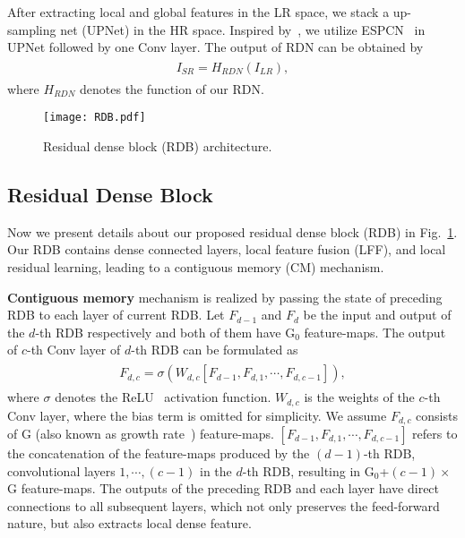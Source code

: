\documentclass[10pt,twocolumn,letterpaper]{article}
\begin{document}
After extracting local and global features in the LR space, we stack a up-sampling net (UPNet) in the HR space. Inspired by~\cite{lim2017enhanced}, we utilize ESPCN~\cite{shi2016real} in UPNet followed by one Conv layer. The output of RDN can be obtained by
\begin{align}
\begin{split}
\label{eq:I_SR}
I_{SR}=H_{RDN}\left ( I_{LR} \right ),
\end{split}
\end{align}  
where $H_{RDN}$ denotes the function of our RDN.
\begin{figure}[htpb]
\centering
\texttt{[image: RDB.pdf]}
\caption{Residual dense block (RDB) architecture.}
\label{fig:RDB} 
\vspace{-4mm} 
\end{figure}

\subsection{Residual Dense Block}
\label{subsec:RDB}
   
Now we present details about our proposed residual dense block (RDB) in Fig.~\ref{fig:RDB}. Our RDB contains dense connected layers, local feature fusion (LFF), and local residual learning, leading to a contiguous memory (CM) mechanism.     

\textbf{Contiguous memory} mechanism is realized by passing the state of preceding RDB to each layer of current RDB. Let $F_{d-1}$ and $F_{d}$ be the input and output of the $d$-th RDB respectively and both of them have G$_{0}$ feature-maps. The output of $c$-th Conv layer of $d$-th RDB can be formulated as
\begin{align}
\begin{split}
\label{eq:F_d_c}
F_{d,c}=\sigma \left ( W_{d,c}\left [ F_{d-1},F_{d,1},\cdots ,F_{d,c-1} \right ]  \right ),
\end{split}
\end{align}
where $\sigma$ denotes the ReLU~\cite{glorot2011deep} activation function. $W_{d,c}$ is the weights of the $c$-th Conv layer, where the bias term is omitted for simplicity. We assume $F_{d,c}$ consists of G (also known as growth rate~\cite{huang2017densely}) feature-maps. $\left [ F_{d-1},F_{d,1},\cdots ,F_{d,c-1} \right ]$ refers to the concatenation of the feature-maps produced by the $(d-1)$-th RDB, convolutional layers $1,\cdots ,\left ( c-1 \right )$ in the $d$-th RDB, resulting in G$_{0}$+$\left ( c-1 \right )\times $G feature-maps. The outputs of the preceding RDB and each layer have direct connections to all subsequent layers, which not only preserves the feed-forward nature, but also extracts local dense feature.
\end{document}
